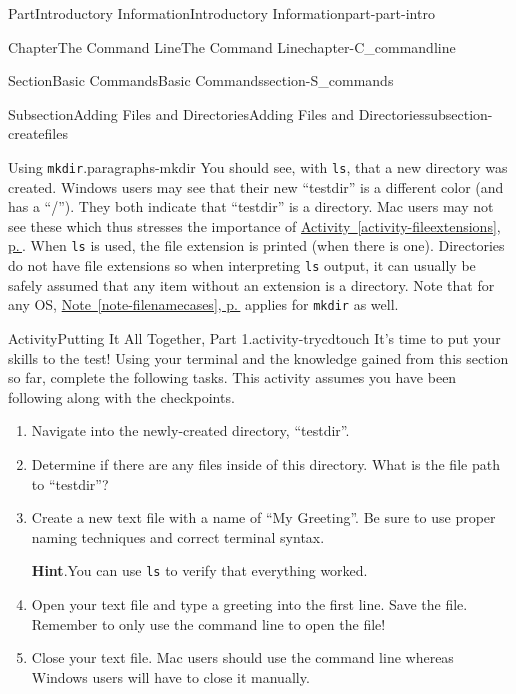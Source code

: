\documentclass[twoside,10pt,]{book}
\newcommand{\blocktitlefont}{\relax}
\newcommand{\xreffont}{\relax}
\newcommand{\mono}[1]{\texttt{#1}}
\begin{document}
\begin{partptx}{Part}{Introductory Information}{}{Introductory Information}{}{}{part-part-intro}
\begin{chapterptx}{Chapter}{The Command Line}{}{The Command Line}{}{}{chapter-C_commandline}
\begin{sectionptx}{Section}{Basic Commands}{}{Basic Commands}{}{}{section-S_commands}
\begin{subsectionptx}{Subsection}{Adding Files and Directories}{}{Adding Files and Directories}{}{}{subsection-createfiles}
\begin{paragraphs}{Using \mono{mkdir}.}{paragraphs-mkdir}
You should see, with \mono{ls}, that a new directory was created. Windows users may see that their new ``testdir'' is a different color (and has a ``\slash{}''). They both indicate that ``testdir'' is a directory. Mac users may not see these which thus stresses the importance of \hyperref[activity-fileextensions]{Activity~{\xreffont\ref{activity-fileextensions}}, p.\,\pageref{activity-fileextensions}}. When \mono{ls} is used, the file extension is printed (when there is one). Directories do not have file extensions so when interpreting \mono{ls} output, it can usually be safely assumed that any item without an extension is a directory. Note that for any OS, \hyperref[note-filenamecases]{Note~{\xreffont\ref{note-filenamecases}}, p.\,\pageref{note-filenamecases}} applies for \mono{mkdir} as well.%
\end{paragraphs}%
\begin{activity}{Activity}{Putting It All Together, Part 1.}{activity-trycdtouch}%
%
It's time to put your skills to the test! Using your terminal and the knowledge gained from this section so far, complete the following tasks. This activity assumes you have been following along with the checkpoints.%
\begin{enumerate}[font=\bfseries,label=(\alph*),ref=\alph*]%
\item{}Navigate into the newly-created directory, ``testdir''.%
\item{}Determine if there are any files inside of this directory. What is the file path to ``testdir''?%
\item{}Create a new text file with a name of ``My Greeting''. Be sure to use proper naming techniques and correct terminal syntax.%
\par\smallskip%
\noindent\textbf{\blocktitlefont Hint}.\label{hint-trycdtouch-f-b}{}\hypertarget{hint-trycdtouch-f-b}{}\quad{}You can use \mono{ls} to verify that everything worked.%
\item{}Open your text file and type a greeting into the first line. Save the file. Remember to only use the command line to open the file!%
\item{}Close your text file. Mac users should use the command line whereas Windows users will have to close it manually.%
\end{enumerate}%
\end{activity}%
\end{subsectionptx}
%
%
\typeout{************************************************}

\end{sectionptx}
\end{chapterptx}
\end{partptx}
\end{document}
